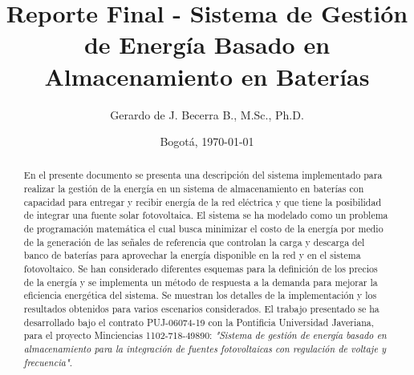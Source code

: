 \titlehead{\centering Pontificia Universidad Javeriana | Facultad de Ingeniería | Departamento de Electrónica}
\title{\Large Reporte Final - Sistema de Gestión de Energía Basado en Almacenamiento en Baterías}
\author{Gerardo de J. Becerra B., M.Sc., Ph.D.}
\date{Bogotá, \today}

\maketitle

\begin{abstract}
	\noindent
En el presente documento se presenta una descripción del sistema implementado para realizar la gestión de la energía en un sistema de almacenamiento en baterías con capacidad para entregar y recibir energía de la red eléctrica y que tiene la posibilidad de integrar una fuente solar fotovoltaica. El sistema se ha modelado como un problema de programación matemática el cual busca minimizar el costo de la energía por medio de la generación de las señales de referencia que controlan la carga y descarga del banco de baterías para aprovechar la energía disponible en la red y en el sistema fotovoltaico. Se han considerado diferentes esquemas para la definición de los precios de la energía y se implementa un método de respuesta a la demanda para mejorar la eficiencia energética del sistema. Se muestran los detalles de la implementación y los resultados obtenidos para varios escenarios considerados.
El trabajo presentado se ha desarrollado bajo el contrato PUJ-06074-19 con la Pontificia Universidad Javeriana, para el proyecto Minciencias 1102-718-49890: \textit{"Sistema de gestión de energía basado en almacenamiento para la integración de fuentes fotovoltaicas con regulación de voltaje y frecuencia"}.
\end{abstract}

\setcounter{tocdepth}{2}
\tableofcontents
